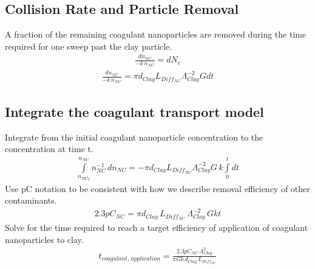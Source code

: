\documentclass[letterpaper,10pt,english]{sphinxmanual}
\begin{document}
\subsection{Collision Rate and Particle Removal}
\label{\detokenize{Rapid_Mix/RM_Theory_and_Future_Work:collision-rate-and-particle-removal}}\label{\detokenize{Rapid_Mix/RM_Theory_and_Future_Work:heading-collision-rate-and-particle-removal}}
A fraction of the remaining coagulant nanoparticles are removed during the time required for one sweep past the clay particle.
\begin{equation}\label{equation:Rapid_Mix/RM_Theory_and_Future_Work:Rapid_Mix/RM_Theory_and_Future_Work:12}
\begin{split}\frac{dn_{NC}}{ - k \, n_{NC}} = dN_c\end{split}
\end{equation}\begin{equation}\label{equation:Rapid_Mix/RM_Theory_and_Future_Work:Rapid_Mix/RM_Theory_and_Future_Work:13}
\begin{split}\frac{dn_{NC}}{ - k \, n_{NC}} = \pi d_{Clay} L_{Diff_{NC}}{\Lambda^{-2}_{Clay}} G dt\end{split}
\end{equation}

\subsection{Integrate the coagulant transport model}
\label{\detokenize{Rapid_Mix/RM_Theory_and_Future_Work:integrate-the-coagulant-transport-model}}\label{\detokenize{Rapid_Mix/RM_Theory_and_Future_Work:heading-integrate-the-coagulant-transport-model}}
Integrate from the initial coagulant nanoparticle concentration to the concentration at time t.
\begin{equation}\label{equation:Rapid_Mix/RM_Theory_and_Future_Work:Rapid_Mix/RM_Theory_and_Future_Work:14}
\begin{split}\int \limits_{n_{NC_0}}^{n_{NC}} n_{NC}^{- 1} \, dn_{NC}  =  - \pi d_{Clay} L_{Diff_{NC}} \Lambda^{-2}_{Clay} G \, k  \int \limits_0^t {dt}\end{split}
\end{equation}
Use pC notation to be consistent with how we describe removal efficiency of other contaminants.
\begin{equation}\label{equation:Rapid_Mix/RM_Theory_and_Future_Work:Rapid_Mix/RM_Theory_and_Future_Work:15}
\begin{split}2.3 p C_{NC} = \pi d_{Clay}\,  L_{Diff_{NC}}\,  \Lambda^{-2}_{Clay}\,  G k  t\end{split}
\end{equation}
Solve for the time required to reach a target efficiency of application of coagulant nanoparticles to clay.
\begin{equation}\label{equation:Rapid_Mix/RM_Theory_and_Future_Work:Rapid_Mix/RM_Theory_and_Future_Work:16}
\begin{split}t_{coagulant, \, application} = \frac{2.3p C_{NC} \, \Lambda_{Clay}^2}{\pi G k \, d_{Clay}\,  L_{Diff_{NC}} }\end{split}
\end{equation}
\end{document}
